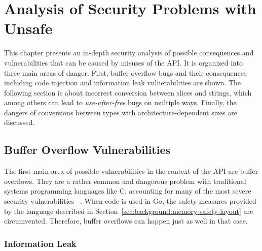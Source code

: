 
\chapter{Analysis of Security Problems with Unsafe}\label{ch:unsafe-security-problems}

This chapter presents an in-depth security analysis of possible consequences and vulnerabilities that can be caused by
misuses of the \unsafe{} \acrshort{API}.
It is organized into three main areas of danger.
First, buffer overflow bugs and their consequences including code injection and information leak vulnerabilities are
shown.
The following section is about incorrect conversion between slices and strings, which among others can lead to
\textit{use-after-free} bugs on multiple ways.
Finally, the dangers of conversions between types with architecture-dependent sizes are discussed.





\section{Buffer Overflow Vulnerabilities}\label{sec:unsafe-security-problems:buffer-overflow}

The first main area of possible vulnerabilities in the context of the \unsafe{} \acrshort{API} are buffer overflows.
They are a rather common and dangerous problem with traditional systems programming languages like C, accounting for
many of the most severe security vulnerabilities~\cite{larochelle2001} .
When \unsafe{} code is used in Go, the safety measures provided by the language described in
Section~\ref{sec:background:memory-safety-layout} are circumvented.
Therefore, buffer overflows can happen just as well in that case.



\subsection{Information Leak}\label{subsec:unsafe-security-problems:buffer-overflow:information-leak}

